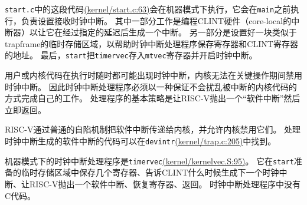 \texttt{start.c}中的这段代码\href{https://github.com/mit-pdos/xv6-riscv/blob/riscv//kernel/start.c#L63/start.c:63}{(kernel/start.c:63)}会在机器模式下执行，它会在\texttt{main}之前执行，负责设置接收时钟中断。
其中一部分工作是编程CLINT硬件（core-local的中断器）以让它在经过指定的延迟后生成一个中断。
另一部分是设置好一块类似于trapframe的临时存储区域，以帮助时钟中断处理程序保存寄存器和CLINT寄存器的地址。
最后，\texttt{start}把\texttt{timervec}存入\texttt{mtvec}寄存器并开启时钟中断。

用户或内核代码在执行时随时都可能出现时钟中断，内核无法在关键操作期间禁用时钟中断。
因此时钟中断处理程序必须以一种保证不会扰乱被中断的内核代码的方式完成自己的工作。
处理程序的基本策略是让RISC-V抛出一个“软件中断”然后立即返回。

RISC-V通过普通的自陷机制把软件中断传递给内核，并允许内核禁用它们。
处理时钟中断生成的软件中断的代码可以在\texttt{devintr}\href{https://github.com/mit-pdos/xv6-riscv/blob/riscv//kernel/trap.c#L205}{(kernel/trap.c:205)}中找到。

机器模式下的时钟中断处理程序是\texttt{timervec}\href{https://github.com/mit-pdos/xv6-riscv/blob/riscv//kernel/kernelvec.S#L95}{(kernel/kernelvec.S:95)}。
它在\texttt{start}准备的临时存储区域中保存几个寄存器、告诉CLINT什么时候生成下一个时钟中断、让RISC-V抛出一个软件中断、恢复寄存器、返回。
时钟中断处理程序中没有C代码。


